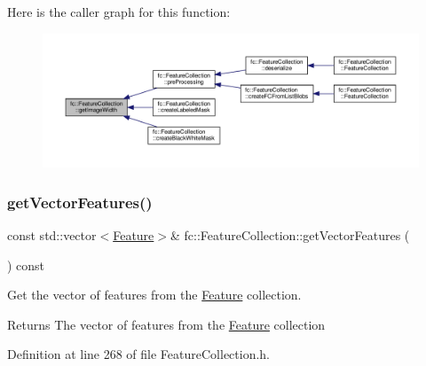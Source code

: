 Here is the caller graph for this function\+:
\nopagebreak
\begin{figure}[H]
\begin{center}
\leavevmode
\includegraphics[width=350pt]{d9/d78/classfc_1_1FeatureCollection_a95ca2ce4b95b45a67b9cfec99cd686f2_icgraph}
\end{center}
\end{figure}
\mbox{\label{classfc_1_1FeatureCollection_aafe9d7aca03c11d4d26a28f7e9360612}} 
\subsubsection{\texorpdfstring{get\+Vector\+Features()}{getVectorFeatures()}}
{\footnotesize\ttfamily const std\+::vector$<$\hyperlink{classfc_1_1Feature}{Feature}$>$\& fc\+::\+Feature\+Collection\+::get\+Vector\+Features (\begin{DoxyParamCaption}{ }\end{DoxyParamCaption}) const\hspace{0.3cm}{\ttfamily [inline]}}



Get the vector of features from the \hyperlink{classfc_1_1Feature}{Feature} collection. 

\begin{DoxyReturn}{Returns}
The vector of features from the \hyperlink{classfc_1_1Feature}{Feature} collection 
\end{DoxyReturn}


Definition at line 268 of file Feature\+Collection.\+h.

